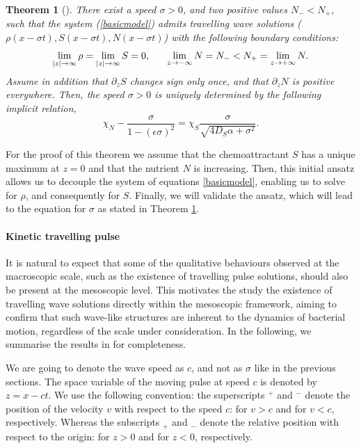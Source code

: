 \documentclass[11pt,twoside]{article}
\theoremstyle{nonumberplain}
\newtheorem{theorem}{Theorem}%
\begin{document}
\begin{theorem}[\cite{calvez2016chemotactic}]\label{thmacro}
There exist a speed $\sigma>0$, and two positive values $N_- < N_+$, such that the system (\ref{basicmodel}) admits travelling wave solutions ($\rho (x- \sigma t), S(x - \sigma t), N(x - \sigma t)$) with the following boundary conditions:
\begin{equation}
    \lim_{|z| \to \infty} \rho = \lim_{|z| \to \infty} S = 0, \hspace{0.6cm} \lim_{z \to -\infty} N = N_- < N_+ = \lim_{z \to + \infty} N.
    \nonumber
\end{equation}
Assume in addition that $\partial_z S$ changes sign only once, and that $\partial_z N$ is positive everywhere. Then, the speed $\sigma > 0$ is uniquely determined by the following implicit relation,
\[
\chi_N - \frac{\sigma}{1 - (\epsilon \sigma)^2} = \chi_S \frac{\sigma}{\sqrt{4 D_S \alpha + \sigma^2}}.
\]
\end{theorem}

For the proof of this theorem we assume that the chemoattractant $S$ has a unique maximum at $z = 0$ and that the nutrient $N$ is increasing. Then, this initial ansatz allows us to decouple the system of equations \eqref{basicmodel}, enabling us to solve for $\rho$, and consequently for $S$. Finally, we will validate the ansatz, which will lead to the equation for $\sigma$ as stated in Theorem \ref{thmacro}.

\paragraph{Kinetic travelling pulse} It is natural to expect that some of the qualitative behaviours observed at the macroscopic scale, such as the existence of travelling pulse solutions, should also be present at the mesoscopic level. This motivates the study the existence of travelling wave solutions directly within the mesoscopic framework, aiming to confirm that such wave-like structures are inherent to the dynamics of bacterial motion, regardless of the scale under consideration.
In the following, we summarise the results in \cite{calvez2016chemotactic} for completeness.

We are going to denote the wave speed as $c$, and not as $\sigma$ like in the previous sections. The space variable of the moving pulse at speed $c$ is denoted by $z = x-ct$.
We use the following convention: the superscripts $^+$ and $^-$ denote the position of the velocity $v$ with respect to the speed $c$: for $v>c$ and for $v<c$, respectively. Whereas the subscripts $_+$ and $_-$ denote the relative position with respect to the origin: for $z>0$ and for $z<0$, respectively. 
\end{document}
